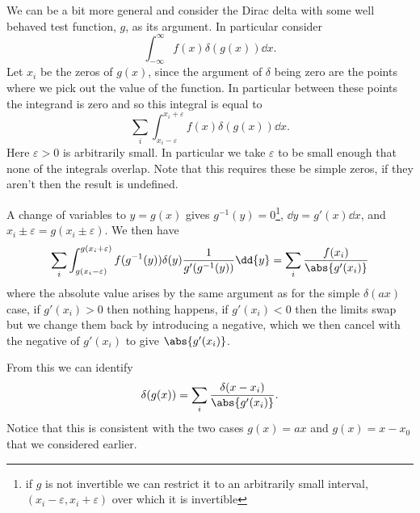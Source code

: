 \documentclass[fleqn]{NotesClass}
\begin{document}
    We can be a bit more general and consider the Dirac delta with some well behaved test function, \(g\), as its argument.
    In particular consider
    \begin{equation}
        \int_{-\infty}^{\infty} f(x)\delta(g(x)) \dd{x}.
    \end{equation}
    Let \(x_i\) be the zeros of \(g(x)\), since the argument of \(\delta\) being zero are the points where we pick out the value of the function.
    In particular between these points the integrand is zero and so this integral is equal to
    \begin{equation}
        \sum_{i}  \int_{x_i - \varepsilon}^{x_i + \varepsilon} f(x)\delta(g(x)) \dd{x}.
    \end{equation}
    Here \(\varepsilon > 0\) is arbitrarily small.
    In particular we take \(\varepsilon\) to be small enough that none of the integrals overlap.
    Note that this requires these be simple zeros, if they aren't then the result is undefined.
    
    A change of variables to \(y = g(x)\) gives \(g^{-1}(y) = 0\)\footnote{if \(g\) is not invertible we can restrict it to an arbitrarily small interval, \((x_i - \varepsilon, x_i + \varepsilon)\) over which it is invertible}, \(\dd{y} = g'(x)\dd{x}\), and \(x_i \pm \varepsilon = g(x_i \pm \varepsilon)\).
    We then have
    \begin{equation}
        \sum_{i} \int_{g(x_i - \varepsilon)}^{g(x_i + \varepsilon)} f(g^{-1}(y))\delta(y)\frac{1}{g'(g^{-1}(y))} \dd{y} = \sum_{i} \frac{f(x_i)}{\abs{g'(x_i)}}
    \end{equation}
    where the absolute value arises by the same argument as for the simple \(\delta(ax)\) case, if \(g'(x_i) > 0\) then nothing happens, if \(g'(x_i) < 0\) then the limits swap but we change them back by introducing a negative, which we then cancel with the negative of \(g'(x_i)\) to give \(\abs{g'(x_i)}\).
    
    From this we can identify
    \begin{equation}
        \delta(g(x)) = \sum_{i} \frac{\delta(x - x_i)}{\abs{g'(x_i)}}.
    \end{equation}
    Notice that this is consistent with the two cases \(g(x) = ax\) and \(g(x) = x - x_0\) that we considered earlier.
    
\end{document}
